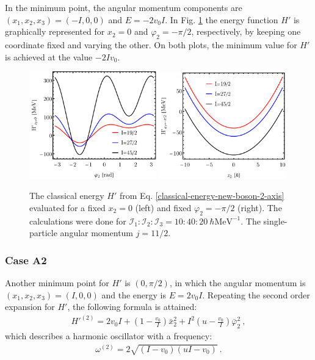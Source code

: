 In the minimum point, the angular momentum components are $(x_1,x_2,x_3)=(-I,0,0)$ and $E=-2v_0I$. In Fig. \ref{energy-function-comparison-a1-case} the energy function $H'$ is graphically represented for $x_2=0$ and $\varphi_2=-\pi/2$, respectively, by keeping one coordinate fixed and varying the other. On both plots, the minimum value for $H'$ is achieved at the value $-2Iv_0$.
\begin{figure}
    \centering
    \includegraphics[width=0.49\textwidth]{Chapters/Figures/Energy-Function-New-Boson-A1-x2-const.pdf}
    \includegraphics[width=0.49\textwidth]{Chapters/Figures/Energy-Function-New-Boson-A1-phi2-const.pdf}
    \caption{The classical energy $H'$ from Eq. \ref{classical-energy-new-boson-2-axis} evaluated for a fixed $x_2=0$ (left) and fixed $\varphi_2=-\pi/2$ (right). The calculations were done for $\mathcal{I}_1:\mathcal{I}_2:\mathcal{I}_3=10:40:20\ \hbar\text{MeV}^{-1}$. The single-particle angular momentum $j=11/2$.}
    \label{energy-function-comparison-a1-case}
\end{figure}

\subsubsection*{Case A2}

Another minimum point for $H'$ is $(0,\pi/2)$, in which the angular momentum is $(x_1,x_2,x_3)=(I,0,0)$ and the energy is $E=2v_0I$. Repeating the second order expansion for $H'$, the following formula is attained:
\begin{align}
    H'^{(2)}=2v_0I+\left(1-\frac{v_0}{I}\right)\bar{x}_2^2+I^2\left(u-\frac{v_0}{I}\right)\bar{\varphi}_2^2\ ,
\end{align}
which describes a harmonic oscillator with a frequency:
\begin{align}
    \omega^{(2)}=2\sqrt{(I-v_0)(uI-v_0)}\ .
\end{align}

